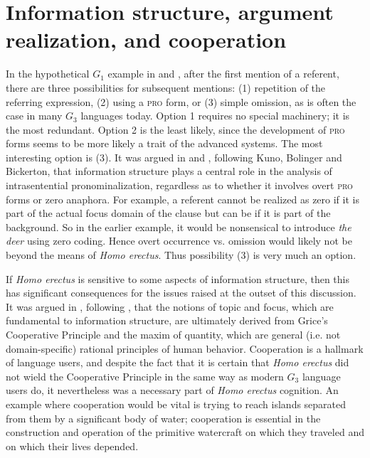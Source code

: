 \documentclass[output=paper,colorlinks,citecolor=brown]{langscibook}
\begin{document}
\section{Information structure, argument realization, and cooperation}\label{sec:vanvalin:4}

In the hypothetical $G_1$ example in  and , after the first mention of a referent, there are three possibilities for subsequent mentions: (1) repetition of the referring expression, (2) using a \textsc{pro} form, or  (3) simple omission, as is often the case in many $G_3$ languages today.  Option 1 requires no special machinery; it is the most redundant.  Option 2 is the least likely, since the development of \textsc{pro} forms seems to be more likely a trait of the advanced systems.  The most interesting option is (3).  It was argued in \citet{van1990functionalism} and \citet{van1997syntax}, following Kuno, Bolinger and Bickerton, that information structure plays a central role in the analysis of intrasentential pronominalization, regardless as to whether it involves overt \textsc{pro} forms or zero anaphora.  For example, a referent cannot be realized as zero if it is part of the actual focus 
domain of the clause but can be if it is part of the background.  So in the earlier example, it would be nonsensical to introduce \emph{the deer} using zero coding.  Hence overt occurrence vs. omission would likely not be beyond the means of \emph{Homo erectus}.  Thus possibility (3) is very much an option.

If \emph{Homo erectus} is sensitive to some aspects of information structure, then this has significant consequences for the issues raised at the outset of this discussion.  It was argued in \citet{van1993synopsis}, following \citet{kempson1975presupposition}, that the notions of topic and focus, which are fundamental to information structure, are ultimately derived from Grice’s Cooperative Principle and the maxim of quantity, which are general (i.e. not domain-specific) rational principles of human behavior.  Cooperation is a hallmark of language users, and despite the fact that it is certain that \emph{Homo erectus} did not wield the Cooperative Principle in the same way as modern $G_3$ language users do, it nevertheless was a necessary part of \emph{Homo erectus} cognition.  An example where cooperation would be vital is trying to reach islands separated from them by a significant body of water; cooperation is essential in the construction and operation of the primitive watercraft on which they traveled and on which their lives depended.
\end{document}

